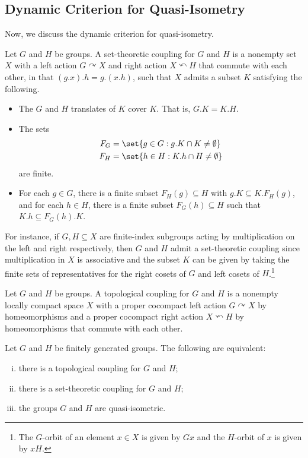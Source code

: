 \documentclass[10pt]{mypackage}
\begin{document}
\subsection{Dynamic Criterion for Quasi-Isometry}%
Now, we discuss the dynamic criterion for quasi-isometry.
\begin{definition}
  Let $G$ and $H$ be groups. A set-theoretic coupling for $G$ and $H$ is a nonempty set $X$ with a left action $G\curvearrowright X$ and right action $X\curvearrowleft H$ that commute with each other, in that $\left( g.x \right).h = g.\left( x.h \right)$, such that $X$ admits a subset $K$ satisfying the following.
  \begin{itemize}
    \item The $G$ and $H$ translates of $K$ cover $K$. That is, $G.K = K.H$.
    \item The sets
      \begin{align*}
        F_G &= \set{g\in G : g.K\cap K \neq \emptyset}\\
        F_H &= \set{h\in H : K.h\cap H \neq \emptyset}
      \end{align*}
      are finite.
    \item For each $g\in G$, there is a finite subset $F_H(g)\subseteq H$ with $g.K\subseteq K.F_H(g)$, and for each $h\in H$, there is a finite subset $F_G(h)\subseteq H$ such that $K.h\subseteq F_G(h).K$.
  \end{itemize}
\end{definition}
For instance, if $G,H\subseteq X$ are finite-index subgroups acting by multiplication on the left and right respectively, then $G$ and $H$ admit a set-theoretic coupling since multiplication in $X$ is associative and the subset $K$ can be given by taking the finite sets of representatives for the right cosets of $G$ and left cosets of $H$.\footnote{The $G$-orbit of an element $x\in X$ is given by $Gx$ and the $H$-orbit of $x$ is given by $xH$.}
\begin{definition}
  Let $G$ and $H$ be groups. A topological coupling for $G$ and $H$ is a nonempty locally compact space $X$ with a proper cocompact left action $G\curvearrowright X$ by homeomorphisms and a proper cocompact right action $X\curvearrowleft H$ by homeomorphisms that commute with each other.
\end{definition}
\begin{theorem}
  Let $G$ and $H$ be finitely generated groups. The following are equivalent:
  \begin{enumerate}[(i)]
    \item there is a topological coupling for $G$ and $H$;
    \item there is a set-theoretic coupling for $G$ and $H$;
    \item the groups $G$ and $H$ are quasi-isometric.
  \end{enumerate}
\end{theorem}
\end{document}
